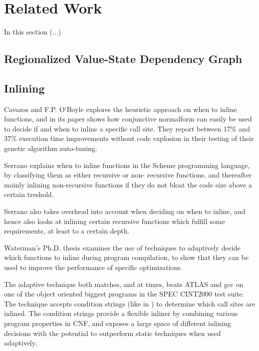 
\section{Related Work}

In this section (...)

\subsection{Regionalized Value-State Dependency Graph}

\subsection{Inlining}

Cavazos and F.P. O'Boyle \cite{AutoTuningJavaHeuristics} explores the heuristic
approach on when to inline functions, and in its paper shows how conjunctive
normalform can easily be used to decide if and when to inline a specific call
site. They report between 17\% and 37\% execution time improvements without
code explosion in their testing of their genetic algorithm auto-tuning.

Serrano \cite{InlineWhenHowSerrano} explains when to inline functions in the
Scheme programming language, by classifying them as either recursive or non-
recursive functions, and thereafter mainly inlining non-recursive functions if
they do not bloat the code size above a certain treshold.

Serrano \cite{InlineWhenHowSerrano} also takes overhead into account when
deciding on when to inline, and hence also looks at inlining certain recursive
functions which fulfill some requirements, at least to a certain depth.

Waterman's Ph.D. thesis \cite{AdaptvCompilAndInlingWaterman} examines the use of
techniques to adaptively decide which functions to inline during program
compilation, to show that they can be used to improve the performance of
specific optimizations.

The adaptive technique both matches, and at times, beats ATLAS  and gcc on one of the object oriented biggest programs in the SPEC
CINT2000 test suite. The technique accepts condition strings (like in
\cite{AutoTuningJavaHeuristics}) to determine which call sites are inlined. The
condition strings provide a flexible inliner by combining various program
properties in CNF, and exposes a large space of different inlining decisions
with the potential to outperform static techniques when used adaptively.

